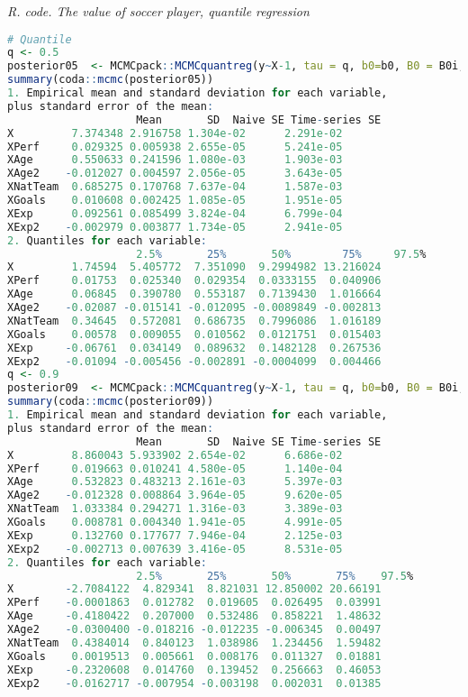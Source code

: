 \begin{tcolorbox}[enhanced,width=4.67in,center upper,
	fontupper=\large\bfseries,drop shadow southwest,sharp corners]
	\textit{R. code. The value of soccer player, quantile regression}
	\begin{VF}
		\begin{lstlisting}[language=R]
# Quantile
q <- 0.5
posterior05  <- MCMCpack::MCMCquantreg(y~X-1, tau = q, b0=b0, B0 = B0i, burnin = burnin, mcmc = mcmc, thin = thin, below = 13.82, above = Inf)
summary(coda::mcmc(posterior05))
1. Empirical mean and standard deviation for each variable,
plus standard error of the mean:
					Mean       SD  Naive SE Time-series SE
X         7.374348 2.916758 1.304e-02      2.291e-02
XPerf     0.029325 0.005938 2.655e-05      5.241e-05
XAge      0.550633 0.241596 1.080e-03      1.903e-03
XAge2    -0.012027 0.004597 2.056e-05      3.643e-05
XNatTeam  0.685275 0.170768 7.637e-04      1.587e-03
XGoals    0.010608 0.002425 1.085e-05      1.951e-05
XExp      0.092561 0.085499 3.824e-04      6.799e-04
XExp2    -0.002979 0.003877 1.734e-05      2.941e-05
2. Quantiles for each variable:
					2.5%       25%       50%        75%     97.5%
X         1.74594  5.405772  7.351090  9.2994982 13.216024
XPerf     0.01753  0.025340  0.029354  0.0333155  0.040906
XAge      0.06845  0.390780  0.553187  0.7139430  1.016664
XAge2    -0.02087 -0.015141 -0.012095 -0.0089849 -0.002813
XNatTeam  0.34645  0.572081  0.686735  0.7996086  1.016189
XGoals    0.00578  0.009055  0.010562  0.0121751  0.015403
XExp     -0.06761  0.034149  0.089632  0.1482128  0.267536
XExp2    -0.01094 -0.005456 -0.002891 -0.0004099  0.004466
q <- 0.9
posterior09  <- MCMCpack::MCMCquantreg(y~X-1, tau = q, b0=b0, B0 = B0i, burnin = burnin, mcmc = mcmc, thin = thin, below = 13.82, above = Inf)
summary(coda::mcmc(posterior09))
1. Empirical mean and standard deviation for each variable,
plus standard error of the mean:
					Mean       SD  Naive SE Time-series SE
X         8.860043 5.933902 2.654e-02      6.686e-02
XPerf     0.019663 0.010241 4.580e-05      1.140e-04
XAge      0.532823 0.483213 2.161e-03      5.397e-03
XAge2    -0.012328 0.008864 3.964e-05      9.620e-05
XNatTeam  1.033384 0.294271 1.316e-03      3.389e-03
XGoals    0.008781 0.004340 1.941e-05      4.991e-05
XExp      0.132760 0.177677 7.946e-04      2.125e-03
XExp2    -0.002713 0.007639 3.416e-05      8.531e-05
2. Quantiles for each variable:
					2.5%       25%       50%       75%    97.5%
X        -2.7084122  4.829341  8.821031 12.850002 20.66191
XPerf    -0.0001863  0.012782  0.019605  0.026495  0.03991
XAge     -0.4180422  0.207000  0.532486  0.858221  1.48632
XAge2    -0.0300400 -0.018216 -0.012235 -0.006345  0.00497
XNatTeam  0.4384014  0.840123  1.038986  1.234456  1.59482
XGoals    0.0019513  0.005661  0.008176  0.011327  0.01881
XExp     -0.2320608  0.014760  0.139452  0.256663  0.46053
XExp2    -0.0162717 -0.007954 -0.003198  0.002031  0.01385
\end{lstlisting}
	\end{VF}
\end{tcolorbox} 

